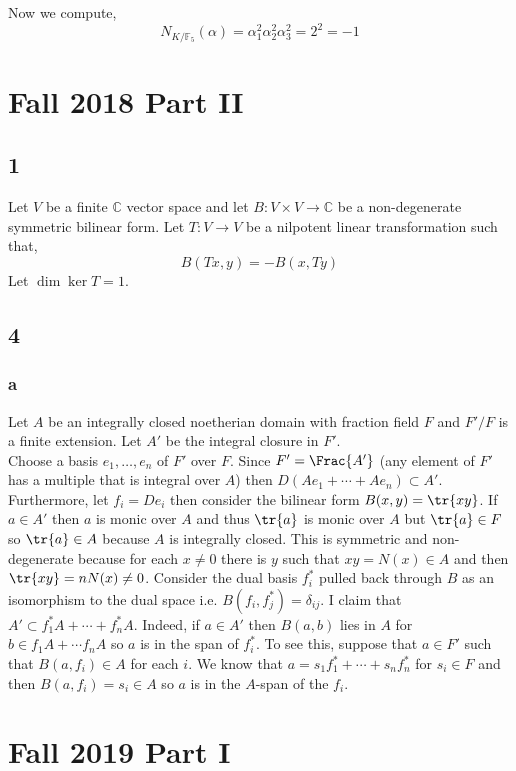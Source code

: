 \documentclass[12pt]{article}
\renewcommand{\C}{\mathbb{C}}
\renewcommand{\F}{\mathbb{F}}
\begin{document}
Now we compute,
\[ N_{K/\F_5}(\alpha) = \alpha_1^2 \alpha_2^2 \alpha_3^2 = 2^2 = -1 \]

\section{Fall 2018 Part II}

\subsection{1}

Let $V$ be a finite $\C$ vector space and let $B : V \times V \to \C$ be a non-degenerate symmetric bilinear form. Let $T : V \to V$ be a nilpotent linear transformation such that,
\[ B(T x, y) = -B(x, Ty) \]
Let $\dim{\ker{T}} = 1$. 


\subsection{4}

\subsubsection{a}

Let $A$ be an integrally closed noetherian domain with fraction field $F$ and $F' / F$ is a finite extension. Let $A'$ be the integral closure in $F'$.
\bigskip\\
Choose a basis $e_1, \dots, e_n$ of $F'$ over $F$. Since $F' = \Frac{A'}$ (any element of $F'$ has a multiple that is integral over $A$) then $D (A e_1 + \cdots + A e_n) \subset A'$. Furthermore, let $f_i = D e_i$ then consider the bilinear form $B(x,y) = \tr{xy}$. If $a \in A'$ then $a$ is monic over $A$ and thus $\tr{a}$ is monic over $A$ but $\tr{a} \in F$ so $\tr{a} \in A$ because $A$ is integrally closed. This is symmetric and non-degenerate because for each $x \neq 0$ there is $y$ such that $xy = N(x) \in A$ and then $\tr{xy} = n N(x) \neq 0$. Consider the dual basis $f^*_i$ pulled back through $B$ as an isomorphism to the dual space i.e. $B(f_i, f_j^*) = \delta_{ij}$. I claim that $A' \subset f_1^* A + \cdots + f_n^* A$. Indeed, if $a \in A'$ then $B(a,b)$ lies in $A$ for $b \in f_1 A + \cdots f_n A$ so $a$ is in the span of $f_i^*$. To see this, suppose that $a \in F'$ such that $B(a,f_i) \in A$ for each $i$. We know that $a = s_1 f_1^* + \cdots + s_n f_n^*$ for $s_i \in F$ and then $B(a,f_i) = s_i \in A$ so $a$ is in the $A$-span of the $f_i$.

\section{Fall 2019 Part I}
\end{document}
